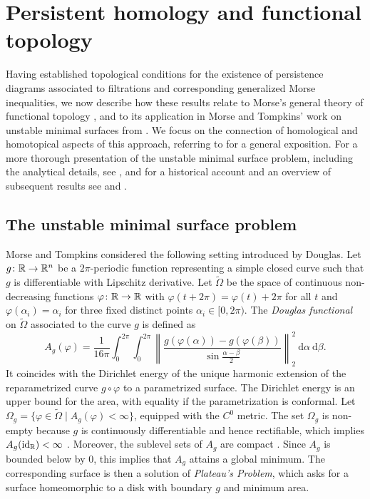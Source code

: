 
\section{Persistent homology and functional topology} \label{s:surfaces}

Having established topological conditions for the existence of persistence diagrams associated to filtrations and corresponding generalized Morse inequalities, we now describe how these results relate to Morse's general theory of functional topology \cite{Morse.1937, Morse.1938, Morse.1940}, and to its application in Morse and Tompkins' work on unstable minimal surfaces from \cite{Morse.1939}.
We focus on the connection of homological and homotopical aspects of this approach, referring to \cite[Sections 4.3--5]{Bott.1980} for a general exposition.
For a more thorough presentation of the unstable minimal surface problem, including the analytical details, see \cite[Section II.6]{Struwe.1988}, and for a historical account and an overview of subsequent results see \cite[Section 6]{Dierkes.2010} and \cite[Section 6.8.1]{Dierkes.2010b}.

\subsection{The unstable minimal surface problem}
\label{subsec:unstable}

Morse and Tompkins considered the following setting introduced by Douglas.
Let $g \colon \mathbb{R} \to \mathbb{R}^n$ be a $2\pi$-periodic function representing a simple closed curve such that $g$ is differentiable with Lipschitz derivative.
Let $\widetilde{\Omega}$ be the space of continuous non-decreasing functions $\varphi \colon \mathbb{R} \to \mathbb{R}$ with $\varphi(t+2\pi) = \varphi(t) + 2\pi$ for all $t$ and $\varphi(\alpha_i)=\alpha_i$ for three fixed distinct points $\alpha_i \in [0,2\pi)$.
The \emph{Douglas functional} on $\widetilde \Omega$ associated to the curve $g$ is defined \cite{Douglas.1931} as
\begin{equation*}
A_g(\varphi) = \frac{1}{16 \pi} \int_0^{2\pi} \int_0^{2\pi} \left\| \frac{g(\varphi(\alpha)) - g(\varphi(\beta))}{\sin \frac{\alpha-\beta}{2}} \right\|_2^2 \ \mathrm{d}\alpha \ \mathrm{d}\beta.
\end{equation*}
It coincides with the Dirichlet energy of the unique harmonic extension of the reparametrized curve $g \circ \varphi$ to a parametrized surface.
The Dirichlet energy is an upper bound for the area, with equality if the parametrization is conformal.
Let $\Omega_g = \{\varphi \in \widetilde\Omega \mid A_g(\varphi) < \infty\}$, equipped with the $C^0$ metric.
The set $\Omega_g$ is non-empty because $g$ is continuously differentiable and hence rectifiable, which implies $A_g(\operatorname{id}_{\mathbb{R}}) < \infty$ \cite[p.~267-268]{Douglas.1931}.
Moreover, the sublevel sets of $A_g$ are compact \cite[p.~448]{Morse.1939}.
Since $A_g$ is bounded below by $0$, this implies that $A_g$ attains a global minimum.
The corresponding surface is then a solution of \emph{Plateau's Problem}, which asks for a surface homeomorphic to a disk with boundary $g$ and minimum area.

